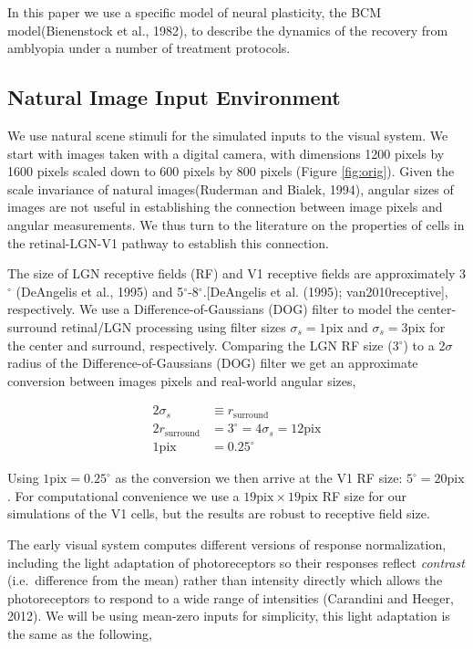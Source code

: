 \documentclass[
  onecolumn]{article}
\begin{document}
In this paper we use a specific model of neural plasticity, the BCM
model(Bienenstock et al., 1982), to describe the dynamics of the
recovery from amblyopia under a number of treatment protocols.

\hypertarget{natural-image-input-environment}{%
\subsection{Natural Image Input
Environment}\label{natural-image-input-environment}}

We use natural scene stimuli for the simulated inputs to the visual
system. We start with images taken with a digital camera, with
dimensions 1200 pixels by 1600 pixels scaled down to 600 pixels by 800
pixels (Figure \ref{fig:orig}). Given the scale invariance of natural
images(Ruderman and Bialek, 1994), angular sizes of images are not
useful in establishing the connection between image pixels and angular
measurements. We thus turn to the literature on the properties of cells
in the retinal-LGN-V1 pathway to establish this connection.

The size of LGN receptive fields (RF) and V1 receptive fields are
approximately 3\(^\circ\) (DeAngelis et al., 1995) and
5\(^\circ\)-8\(^\circ\).{[}DeAngelis et al. (1995); van2010receptive{]},
respectively. We use a Difference-of-Gaussians (DOG) filter to model the
center-surround retinal/LGN processing using filter sizes
\(\sigma_s=1 \text{pix}\) and \(\sigma_s=3 \text{pix}\) for the center
and surround, respectively. Comparing the LGN RF size (3\(^\circ\)) to a
2\(\sigma\) radius of the Difference-of-Gaussians (DOG) filter we get an
approximate conversion between images pixels and real-world angular
sizes,

\[
\begin{aligned}
2\sigma_s &\equiv r_{\text{surround}} \\
2r_{\text{surround}} &= 3^\circ = 4\sigma_s = 12 \text{pix} \\
1 \text{pix} &= 0.25^\circ
\end{aligned}
\]

Using \(1 \text{pix} = 0.25^\circ\) as the conversion we then arrive at
the V1 RF size: \(5^\circ = 20 \text{pix}\). For computational
convenience we use a \(19 \text{pix}\times 19 \text{pix}\) RF size for
our simulations of the V1 cells, but the results are robust to receptive
field size.

The early visual system computes different versions of response
normalization, including the light adaptation of photoreceptors so their
responses reflect \emph{contrast} (i.e.~difference from the mean) rather
than intensity directly which allows the photoreceptors to respond to a
wide range of intensities (Carandini and Heeger, 2012). We will be using
mean-zero inputs for simplicity, this light adaptation is the same as
the following,
\end{document}
